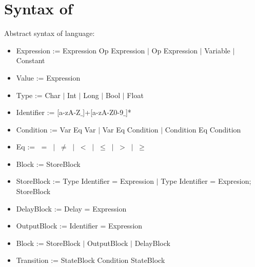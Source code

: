 \section{Syntax of \plcchart}
\label{sec:statechartsyn}

Abstract syntax of \plcchart language:
\begin{definition}
\plcchart

\begin{itemize}
	\item Expression := Expression Op Expression $\mid$ Op Expression $\mid$ Variable $\mid$ Constant
	\item Value := Expression
	\item Type := Char $\mid$ Int $\mid$ Long $\mid$ Bool $\mid$ Float
	\item Identifier := [a-zA-Z$\_$]+[a-zA-Z0-9$\_$]*  

	\item Condition := Var Eq Var $\mid$ Var Eq Condition $\mid$ Condition Eq Condition
	
	\item Eq := $\; = \; \mid \; \neq \; \mid \; < \; \mid \; \leq \; \mid \; > \; \mid \; \geq$	

	\item Block := StoreBlock	
		
	\item StoreBlock := Type Identifier = Expression $\mid$ Type Identifier = Expresion; StoreBlock
	\item DelayBlock := Delay = Expression
	\item OutputBlock := Identifier = Expression
	\item Block := StoreBlock $\mid$ OutputBlock $\mid$ DelayBlock
	
	
	\item Transition := StateBlock Condition StateBlock
\end{itemize}
\end{definition}

